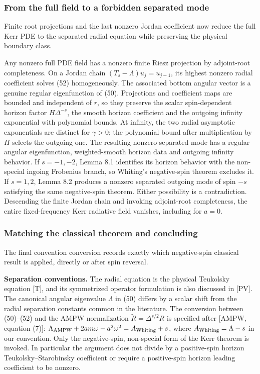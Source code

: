 \documentclass[11pt,a4paper]{article}
\begin{document}
\subsubsection{From the full field to a forbidden separated mode}\label{readable-kerr-full}

Finite root projections and the last nonzero Jordan coefficient now reduce the full Kerr PDE to the separated radial equation while preserving the physical boundary class.

Any nonzero full PDE field has a nonzero finite Riesz projection by
adjoint-root completeness. On a Jordan chain
\((T_s-\Lambda)u_j=u_{j-1}\), its highest nonzero radial coefficient
solves (52) homogeneously. The associated bottom angular vector is a
genuine regular eigenfunction of (50). Projections and coefficient maps
are bounded and independent of \(r\), so they preserve the scalar
spin-dependent horizon factor \(H\Delta^{-s}\), the smooth horizon
coefficient and the outgoing infinity exponential with polynomial
bounds. At infinity, the two radial asymptotic exponentials are distinct
for \(\gamma>0\); the polynomial bound after multiplication by \(H\)
selects the outgoing one. The resulting nonzero separated mode has a
regular angular eigenfunction, weighted-smooth horizon data and outgoing
infinity behavior. If \(s=-1,-2\), Lemma 8.1 identifies its horizon
behavior with the non-special ingoing Frobenius branch, so Whiting's
negative-spin theorem excludes it. If \(s=1,2\), Lemma 8.2 produces a
nonzero separated outgoing mode of spin \(-s\) satisfying the same
negative-spin theorem. Either possibility is a contradiction. Descending
the finite Jordan chain and invoking adjoint-root completeness, the
entire fixed-frequency Kerr radiative field vanishes, including for
\(a=0\).

\subsubsection{Matching the classical theorem and concluding}\label{readable-kerr-conventions}

The final convention conversion records exactly which negative-spin classical result is applied, directly or after spin reversal.

\textbf{Separation conventions.} The radial equation is the physical
Teukolsky equation {[}T{]}, and its symmetrized operator formulation is
also discussed in {[}PV{]}. The canonical angular eigenvalue \(\Lambda\)
in (50) differs by a scalar shift from the radial separation constants
common in the literature. The conversion between (50)--(52) and the AMPW
normalization \(\widetilde R=\Delta^{s/2}R\) is specified after {[}AMPW,
equation (7){]}:
\(\Lambda_{\rm AMPW}+2am\omega-a^2\omega^2=A_{\rm Whiting}+s\), where
\(A_{\rm Whiting}=\Lambda-s\) in our convention. Only the negative-spin,
non-special form of the Kerr theorem is invoked. In particular the
argument does not divide by a positive-spin horizon
Teukolsky--Starobinsky coefficient or require a positive-spin horizon
leading coefficient to be nonzero.
\end{document}
